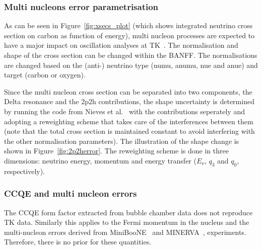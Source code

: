 \subsubsection{Multi nucleons error parametrisation}
As can be seen in Figure~\ref{fig:xsecs_plot} (which shows integrated
neutrino cross section on carbon as function of energy), multi nucleon
processes are expected to have a major impact on oscillation analyses
at \Gls{TK}~\cite{MartiniERec}. The normalisation and shape of the
cross section can be changed within the \Gls{BANFF}. The
normalisations are changed based on the (anti-) neutrino type
(\gls{numu}, \gls{anumu}, \gls{nue} and \gls{anue}) and target (carbon
or oxygen).

Since the multi nucleon cross section can be separated into two
components, the Delta resonance and the \gls{2p2h} contributions, the
shape uncertainty is determined by running the code from Nieves et
al.~\cite{NievesCCinc} with the contributions seperately and adopting
a reweighting scheme that takes care of the interferences between them
(note that the total cross section is maintained constant to avoid
interfering with the other normalisation parameters). The illustration
of the shape change is shown in Figure~\ref{fig:2p2herror}. The
reweighting scheme is done in three dimensions: neutrino energy,
momentum and energy transfer ($E_\nu$, $q_3$ and $q_0$, respectively).

\subsubsection{CCQE and multi nucleon errors}
The \Gls{CCQE} form factor extracted from bubble chamber
data\cite{ANLCCQE,BNLCCQE,CERNCCQE} does not reproduce \Gls{TK}
data. Similarly this applies to the Fermi momentum in the nucleus and
the multi-nucleon errors derived from
\Gls{MiniBooNE}~\cite{MiniBooNENuCCQE} and
\Gls{MINERVA}~\cite{MinervaNuCCQE}, experiments. Therefore, there is
no prior for these quantities.

